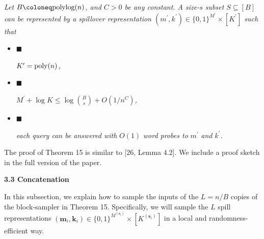 \documentclass[10pt,a4paper]{article}
\begin{document}
\emph{Let $B\coloneq\textnormal{polylog}(n)$, and $C>0$ be any constant.
A size-$s$ subset $S\subseteq[B]$ can be represented by a spillover representation $(m^{\prime},k^{\prime})\in\{0,1\}^{M^{\prime}}\times[K^{\prime}]$ such that}\par


\begin{itemize}


\item[] 
$\blacksquare$ 


$K^{\prime}=\textnormal{poly}(n)$\emph{,}\par





\item[] 
$\blacksquare$ 


$M^{\prime}+\log K\leq\log\binom{B}{s}+O(1/n^{C})$\emph{,}\par





\item[] 
$\blacksquare$ 


\emph{each query can be answered with }$O(1)$\emph{ word probes to }$m^{\prime}$\emph{ and }$k^{\prime}$\emph{.}\par





\end{itemize}






The proof of Theorem 15 is similar to [26, Lemma 4.2].
We include a proof sketch in the full version of the paper.\par





\par\medskip\noindent\textbf{
3.3 Concatenation}\par




In this subsection, we explain how to sample the inputs of the $L=n/B$ copies of the block-sampler in Theorem 15.
Specifically, we will sample the $L$ spill representations $(\boldsymbol{m}_{i},\boldsymbol{k}_{i})\in\{0,1\}^{M^{(\boldsymbol{s}_{i})}}\times[K^{(\boldsymbol{s}_{i})}]$ in a local and randomness-efficient way.\par
\end{document}
